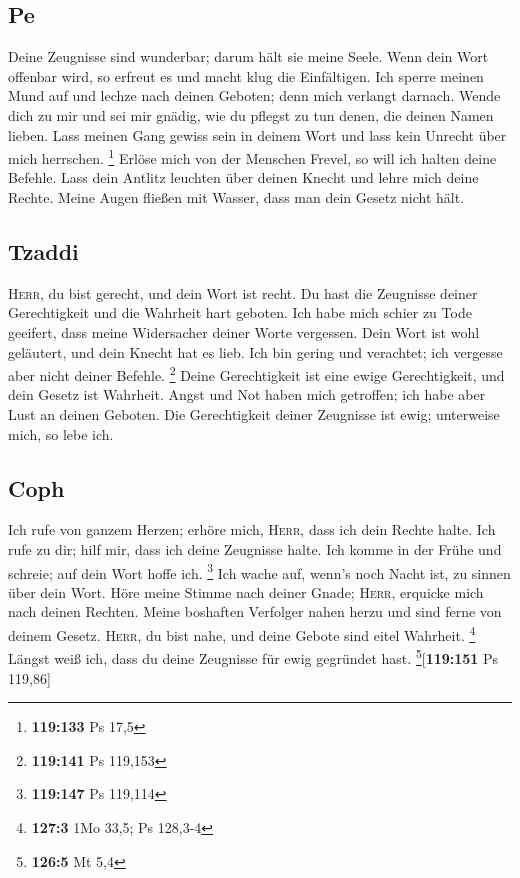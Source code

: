 \hypertarget{pe}{%
\subsection{Pe}\label{pe}}

 Deine Zeugnisse sind wunderbar; darum hält sie meine
Seele.  Wenn dein Wort offenbar wird, so erfreut es und
macht klug die Einfältigen.  Ich sperre meinen Mund auf
und lechze nach deinen Geboten; denn mich verlangt darnach.
 Wende dich zu mir und sei mir gnädig, wie du pflegst zu
tun denen, die deinen Namen lieben.  Lass meinen Gang
gewiss sein in deinem Wort und lass kein Unrecht über mich herrschen.
\footnote{\textbf{119:133} Ps 17,5}  Erlöse mich von der
Menschen Frevel, so will ich halten deine Befehle.  Lass
dein Antlitz leuchten über deinen Knecht und lehre mich deine Rechte.
 Meine Augen fließen mit Wasser, dass man dein Gesetz
nicht hält.

\hypertarget{tzaddi}{%
\subsection{Tzaddi}\label{tzaddi}}

 \textsc{Herr}, du bist gerecht, und dein Wort ist
recht.  Du hast die Zeugnisse deiner Gerechtigkeit und
die Wahrheit hart geboten.  Ich habe mich schier zu Tode
geeifert, dass meine Widersacher deiner Worte vergessen.
 Dein Wort ist wohl geläutert, und dein Knecht hat es
lieb.  Ich bin gering und verachtet; ich vergesse aber
nicht deiner Befehle. \footnote{\textbf{119:141} Ps 119,153}
 Deine Gerechtigkeit ist eine ewige Gerechtigkeit, und
dein Gesetz ist Wahrheit.  Angst und Not haben mich
getroffen; ich habe aber Lust an deinen Geboten.  Die
Gerechtigkeit deiner Zeugnisse ist ewig; unterweise mich, so lebe ich.

\hypertarget{coph}{%
\subsection{Coph}\label{coph}}

 Ich rufe von ganzem Herzen; erhöre mich, \textsc{Herr},
dass ich dein Rechte halte.  Ich rufe zu dir; hilf mir,
dass ich deine Zeugnisse halte.  Ich komme in der Frühe
und schreie; auf dein Wort hoffe ich. \footnote{\textbf{119:147} Ps
  119,114}  Ich wache auf, wenn's noch Nacht ist, zu
sinnen über dein Wort.  Höre meine Stimme nach deiner
Gnade; \textsc{Herr}, erquicke mich nach deinen Rechten.
 Meine boshaften Verfolger nahen herzu und sind ferne
von deinem Gesetz.  \textsc{Herr}, du bist nahe, und
deine Gebote sind eitel Wahrheit. \footnote{\textbf{127:3} 1Mo 33,5; Ps
  128,3-4}  Längst weiß ich, dass du deine Zeugnisse für
ewig gegründet hast. \footnote{\textbf{126:5} Mt 5,4}{[}\textbf{119:151}
Ps 119,86{]}

